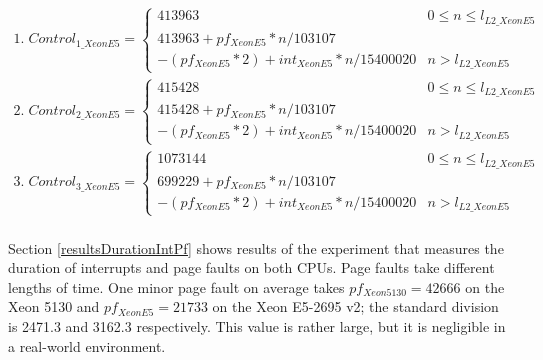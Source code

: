 \begin{equation}\label{eq:discussion80}
\begin{split}
1.\; Control_{1\_XeonE5} = \begin{cases}413963 & 0 \leq n \leq l_{L2\_XeonE5} \\ 413963 + pf_{XeonE5} * n / 103107 \\ - (pf_{XeonE5} * 2) + int_{XeonE5} * n / 15400020 & n > l_{L2\_XeonE5}\end{cases} \\
2.\; Control_{2\_XeonE5} = \begin{cases}415428 & 0 \leq n \leq l_{L2\_XeonE5} \\ 415428 + pf_{XeonE5} * n / 103107 \\ - (pf_{XeonE5} * 2) + int_{XeonE5} * n / 15400020 & n > l_{L2\_XeonE5}\end{cases} \\
3.\; Control_{3\_XeonE5} = \begin{cases}1073144 & 0 \leq n \leq l_{L2\_XeonE5} \\ 699229 + pf_{XeonE5} * n / 103107 \\ - (pf_{XeonE5} * 2) + int_{XeonE5} * n / 15400020 & n > l_{L2\_XeonE5}\end{cases} \\
\end{split}
\end{equation}

Section \ref{resultsDurationIntPf} shows results of the experiment that measures the duration of interrupts and page faults on both CPUs. Page faults take different lengths of time. One minor page fault on average takes $pf_{Xeon5130} = 42666$ on the Xeon 5130 and $pf_{XeonE5} = 21733$ on the Xeon E5-2695 v2; the standard division is 2471.3 and 3162.3 respectively. This value is rather large, but it is negligible in a real-world environment.

